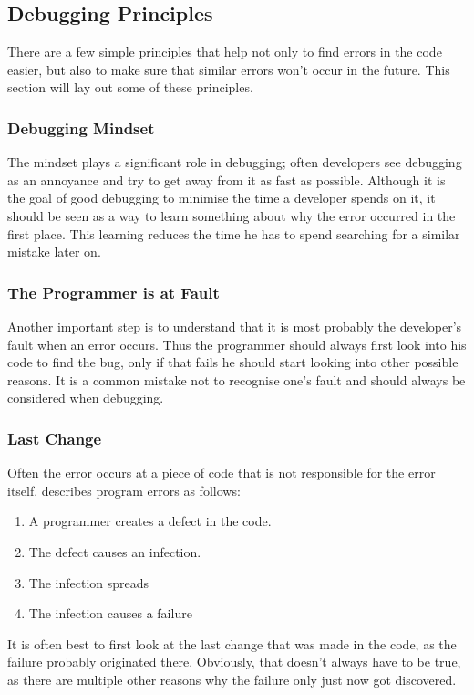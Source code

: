 \subsection{Debugging Principles}

There are a few simple principles that help not only to find errors in the code easier, but also to make sure that similar errors won't occur in the future. This section will lay out some of these principles.

\subsubsection{Debugging Mindset}
The mindset plays a significant role in debugging; often developers see debugging as an annoyance and try to get away from it as fast as possible. Although it is the goal of good debugging to minimise the time a developer spends on it, it should be seen as a way to learn something about why the error occurred in the first place. This learning reduces the time he has to spend searching for a similar mistake later on.

\subsubsection{The Programmer is at Fault}
Another important step is to understand that it is most probably the developer's fault when an error occurs. Thus the programmer should always first look into his code to find the bug, only if that fails he should start looking into other possible reasons. It is a common mistake not to recognise one's fault and should always be considered when debugging.

\subsubsection{Last Change}
Often the error occurs at a piece of code that is not responsible for the error itself. \cite{Zeller:2009:WPF:1718010} describes program errors as follows:
\begin{enumerate}
  \item A programmer creates a defect in the code.
  \item The defect causes an infection.
  \item The infection spreads
  \item The infection causes a failure
\end{enumerate}

It is often best to first look at the last change that was made in the code, as the failure probably originated there. Obviously, that doesn't always have to be true, as there are multiple other reasons why the failure only just now got discovered.

